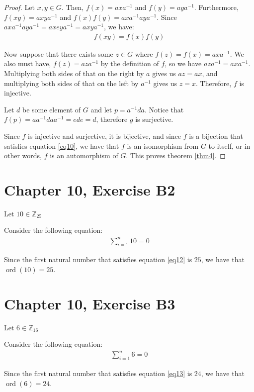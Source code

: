 \documentclass[12pt]{article}
\newcommand{\ints}{\mathbb{Z}}
\newcommand{\ord}{\operatorname{ord}}
\begin{document}
\begin{proof}
	Let $x,y \in G$.
	Then, $f(x) = axa^{-1}$ and $f(y) = aya^{-1}$.
	Furthermore, $f(xy) = axya^{-1}$ and $f(x)f(y) = axa^{-1}aya^{-1}$.
	Since $axa^{-1}aya^{-1} = axeya^{-1} = axya^{-1}$,
	we have:
	\begin{align} \label{eq10}
		f(xy) = f(x)f(y)
	\end{align}

	Now suppose that there exists some $z \in G$ where $f(z) = f(x) = axa^{-1}$.
	We also must have, $f(z) = aza^{-1}$ by the definition of $f$,
	so we have $aza^{-1} = axa^{-1}$.
	Multiplying both sides of that on the right by $a$
	gives us $az = ax$,
	and multiplying both sides of that on the left by $a^{-1}$
	gives us $z = x$.
	Therefore, $f$ is injective.

	Let $d$ be some element of $G$ and let $p = a^{-1}da$.
	Notice that $f(p) = aa^{-1}daa^{-1} = ede = d$, 
	therefore $g$ is surjective.

	Since $f$ is injective and surjective,
	it is bijective,
	and since $f$ is a bijection that satisfies
	equation \ref{eq10},
	we have that $f$ is an isomorphism from $G$ to itself,
	or in other words, $f$ is an automorphism of $G$.
	This proves theorem \ref{thm4}.
\end{proof}

\section{Chapter 10, Exercise B2}

Let $10 \in \ints_{25}$

Consider the following equation:
\begin{align} \label{eq12}
	\sum_{i=1}^n 10 = 0
\end{align}

Since the first natural number that satisfies equation \ref{eq12}
is $25$, we have that $\ord(10) = 25$.

\section{Chapter 10, Exercise B3}

Let $6 \in \ints_{16}$

Consider the following equation:
\begin{align} \label{eq13}
	\sum_{i=1}^n 6 = 0
\end{align}

Since the first natural number that satisfies equation \ref{eq13}
is $24$, we have that $\ord(6) = 24$.
\end{document}
